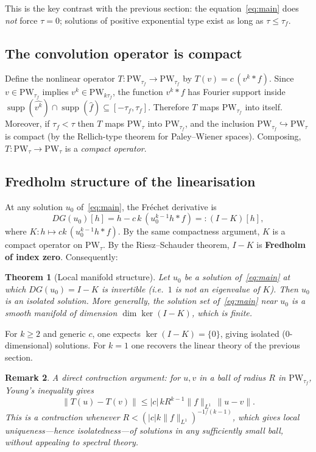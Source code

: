 \documentclass[12pt]{article}
\newtheorem{theorem}{Theorem}[section]
\newtheorem{remark}[theorem]{Remark}
\DeclareMathOperator{\supp}{supp}
\newcommand{\PW}{\mathrm{PW}}
\newcommand{\wh}{\widehat}
\newcommand{\abs}[1]{\left|#1\right|}
\begin{document}
This is the key contrast with the previous section: the equation~\eqref{eq:main}
does \emph{not} force $\tau = 0$; solutions of positive exponential type
exist as long as $\tau \leq \tau_f$.

\subsection{The convolution operator is compact}

Define the nonlinear operator $T : \PW_{\tau_f} \to \PW_{\tau_f}$ by
$T(v) = c\,(v^k \ast f)$.
Since $v \in \PW_{\tau_f}$ implies $v^k \in \PW_{k\tau_f}$, the function
$v^k \ast f$ has Fourier support inside
$\supp(\wh{v^k})\cap\supp(\wh{f}) \subseteq [-\tau_f,\tau_f]$.
Therefore $T$ maps $\PW_{\tau_f}$ into itself.
Moreover, if $\tau_f < \tau$ then $T$ maps $\PW_\tau$ into $\PW_{\tau_f}$, and
the inclusion $\PW_{\tau_f} \hookrightarrow \PW_\tau$ is compact
(by the Rellich-type theorem for Paley--Wiener spaces).
Composing, $T : \PW_\tau \to \PW_\tau$ is a \emph{compact operator}.

\subsection{Fredholm structure of the linearisation}

At any solution $u_0$ of~\eqref{eq:main}, the Fréchet derivative is
\[
  DG(u_0)[h] = h - c\,k\,(u_0^{k-1}h \ast f) =: (I - K)[h],
\]
where $K : h \mapsto ck\,(u_0^{k-1}h \ast f)$.
By the same compactness argument, $K$ is a compact operator on $\PW_\tau$.
By the Riesz--Schauder theorem, $I - K$ is \textbf{Fredholm of index zero}.
Consequently:

\begin{theorem}[Local manifold structure]
  \label{thm:local-mfd}
  Let $u_0$ be a solution of~\eqref{eq:main} at which $DG(u_0) = I - K$ is
  invertible (i.e.\ $1$ is not an eigenvalue of $K$).
  Then $u_0$ is an \emph{isolated solution}.
  More generally, the solution set of~\eqref{eq:main} near $u_0$ is a smooth
  manifold of dimension $\dim\ker(I-K)$, which is finite.
\end{theorem}

For $k \geq 2$ and generic $c$, one expects $\ker(I-K) = \{0\}$, giving
isolated (0-dimensional) solutions.
For $k = 1$ one recovers the linear theory of the previous section.

\begin{remark}
  A direct contraction argument: for $u, v$ in a ball of radius $R$ in
  $\PW_{\tau_f}$, Young's inequality gives
  \[
    \|T(u) - T(v)\|
      \leq \abs{c}\,k R^{k-1}\|f\|_{L^1}\,\|u - v\|.
  \]
  This is a contraction whenever $R < (\abs{c}k\|f\|_{L^1})^{-1/(k-1)}$,
  which gives local uniqueness—hence isolatedness—of solutions in any
  sufficiently small ball, without appealing to spectral theory.
\end{remark}
\end{document}
